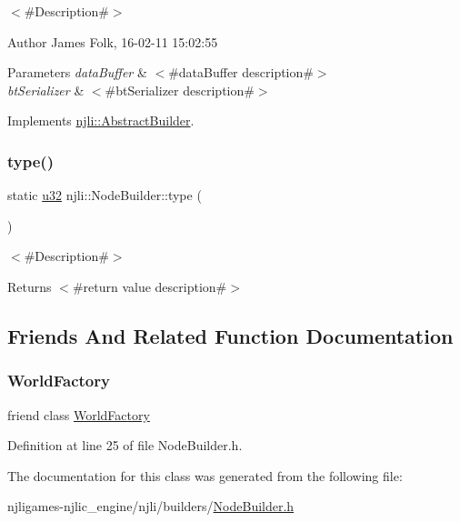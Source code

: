 $<$\#\+Description\#$>$ 

\begin{DoxyAuthor}{Author}
James Folk, 16-\/02-\/11 15\+:02\+:55
\end{DoxyAuthor}

\begin{DoxyParams}{Parameters}
{\em data\+Buffer} & $<$\#data\+Buffer description\#$>$ \\
\hline
{\em bt\+Serializer} & $<$\#bt\+Serializer description\#$>$ \\
\hline
\end{DoxyParams}


Implements \mbox{\hyperlink{classnjli_1_1_abstract_builder_ab66b774e02ccb9da554c9aab7fa6d981}{njli\+::\+Abstract\+Builder}}.

\mbox{\label{classnjli_1_1_node_builder_ae9741693ab2cb281c617ae99401e4eb7}} 
\subsubsection{\texorpdfstring{type()}{type()}}
{\footnotesize\ttfamily static \mbox{\hyperlink{_util_8h_a10e94b422ef0c20dcdec20d31a1f5049}{u32}} njli\+::\+Node\+Builder\+::type (\begin{DoxyParamCaption}{ }\end{DoxyParamCaption})\hspace{0.3cm}{\ttfamily [static]}}

$<$\#\+Description\#$>$

\begin{DoxyReturn}{Returns}
$<$\#return value description\#$>$ 
\end{DoxyReturn}


\subsection{Friends And Related Function Documentation}
\mbox{\label{classnjli_1_1_node_builder_acb96ebb09abe8f2a37a915a842babfac}} 
\subsubsection{\texorpdfstring{World\+Factory}{WorldFactory}}
{\footnotesize\ttfamily friend class \mbox{\hyperlink{classnjli_1_1_world_factory}{World\+Factory}}\hspace{0.3cm}{\ttfamily [friend]}}



Definition at line 25 of file Node\+Builder.\+h.



The documentation for this class was generated from the following file\+:\begin{DoxyCompactItemize}
\item 
njligames-\/njlic\+\_\+engine/njli/builders/\mbox{\hyperlink{_node_builder_8h}{Node\+Builder.\+h}}\end{DoxyCompactItemize}
